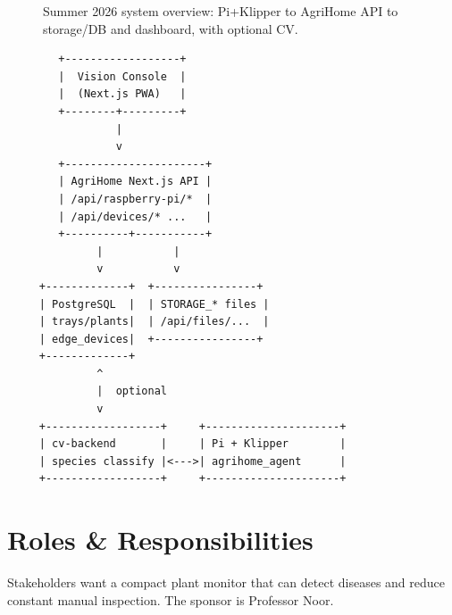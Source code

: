 \documentclass[11pt,letterpaper]{article}
\begin{document}
\begin{figure}[H]
\centering
{}
\caption{Summer 2026 system overview: Pi+Klipper to AgriHome API to storage/DB and dashboard, with optional CV.}
\label{fig:charter-overview}
\end{figure}

\begin{verbatim}
        +------------------+
        |  Vision Console  |
        |  (Next.js PWA)   |
        +--------+---------+
                 |
                 v
        +----------------------+
        | AgriHome Next.js API |
        | /api/raspberry-pi/*  |
        | /api/devices/* ...   |
        +----------+-----------+
              |           |
              v           v
     +-------------+  +----------------+
     | PostgreSQL  |  | STORAGE_* files |
     | trays/plants|  | /api/files/...  |
     | edge_devices|  +----------------+
     +-------------+
              ^
              |  optional
              v
     +------------------+     +---------------------+
     | cv-backend       |     | Pi + Klipper        |
     | species classify |<--->| agrihome_agent      |
     +------------------+     +---------------------+
\end{verbatim}

\section{Roles \& Responsibilities}
Stakeholders want a compact plant monitor that can detect diseases and reduce constant manual
inspection. The sponsor is Professor Noor.
\end{document}
